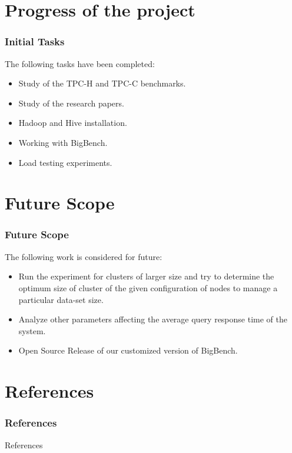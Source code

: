 \documentclass[12pt,xcolor=dvipsnames]{beamer}
\begin{document}
\section{Progress of the project}
\begin{frame}[t]
\frametitle{Initial Tasks}
 The following tasks have been completed:
\begin{itemize}
 \item  Study of the TPC-H and TPC-C benchmarks.
 \item  Study of the research papers. \cite{paper} \cite{paper1}
 \item  Hadoop and Hive installation.
 \item  Working with BigBench.
 \item  Load testing experiments.
\end{itemize}
\end{frame}

\section{Future Scope}
\begin{frame}[t]
\frametitle{Future Scope}
 The following work is considered for future:
\begin{itemize}
 \item  Run the experiment for clusters of larger size and try to determine the optimum size of cluster of the given
	configuration of nodes to manage a particular data-set size.
 \item Analyze other parameters affecting the average query response time of the system.
 \item  Open Source Release of our customized version of BigBench.
\end{itemize}
\end{frame}

\section{References }
\frametitle{References }
\begin{frame}[allowframebreaks]{References}


%




\end{frame}
\end{document}
